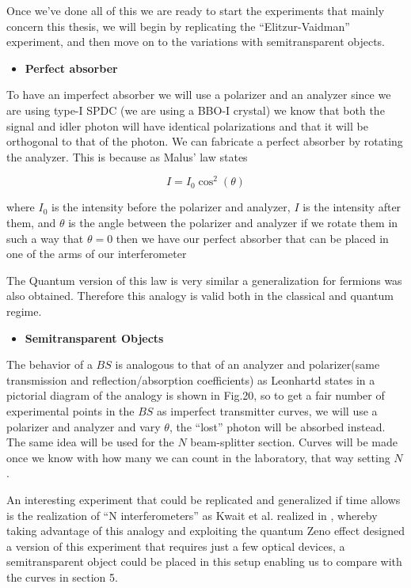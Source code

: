 \documentclass[12pt]{article}
\begin{document}
Once we've done all of this we are ready to start the experiments that mainly concern this thesis, we will begin by replicating the ``Elitzur-Vaidman'' experiment, and then move on to the variations with semitransparent objects.
\begin{itemize}
\item {\large \textbf{Perfect absorber}}
\end{itemize}
To have an imperfect absorber we will use a polarizer and an analyzer since we are using type-I SPDC (we are using a BBO-I crystal) we know that both the signal and idler photon will have identical polarizations and that it will be orthogonal to that of the photon. We can fabricate a perfect absorber by rotating the analyzer. This is because as Malus' law states \cite{hecht}

\begin{equation}
I=I_{0} \cos^{2}(\theta)
\end{equation}

where $I_{0}$ is the intensity before the polarizer and analyzer, $I$ is the intensity after them, and $\theta$ is the angle between the polarizer and analyzer if we rotate them in such a way that $\theta=0$ then we have our perfect absorber that can be placed in one of the arms of our interferometer


The Quantum version of this law is very similar \cite{malus} a generalization for fermions was also obtained. Therefore this analogy is valid both in the classical and quantum regime.
 \begin{itemize}
\item {\large \textbf{Semitransparent Objects}}
\end{itemize}

The behavior of a $BS$ is analogous to that of an analyzer and polarizer(same transmission and reflection/absorption coefficients) as Leonhartd states in \cite{Leonhardt_2003} a pictorial diagram of the analogy is shown in Fig.20, so to get a fair number of experimental points in the $BS$ as imperfect transmitter curves, we will use a polarizer and analyzer and vary $\theta$, the ``lost'' photon will be absorbed instead. The same idea will be used for the $N$ beam-splitter section. Curves will be made once we know with how many we can count in the laboratory, that way setting $N$.


An interesting experiment that could be replicated and generalized if time allows is the realization of ``N interferometers'' as Kwait et al. realized in \cite{exp}, whereby taking advantage of this analogy and exploiting the quantum Zeno effect \cite{zeno} designed a version of this experiment that requires just a few optical devices, a semitransparent object could be placed in this setup enabling us to compare with the curves in section 5.
\end{document}
